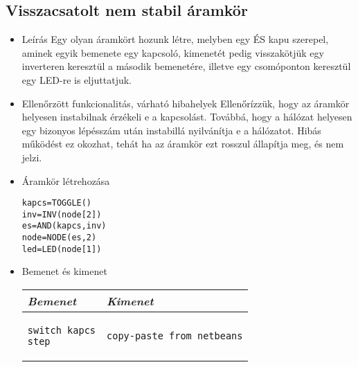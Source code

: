 \subsection{Visszacsatolt nem stabil áramkör}
\begin{itemize}
\item Leírás\newline
Egy olyan áramkört hozunk létre, melyben egy ÉS kapu szerepel, aminek egyik bemenete egy kapcsoló, kimenetét pedig visszakötjük egy inverteren keresztül a második bemenetére, illetve egy csomóponton keresztül egy LED-re is eljuttatjuk.
\item Ellenőrzött funkcionalitás, várható hibahelyek\newline
Ellenőrízzük, hogy az áramkör helyesen instabilnak érzékeli e a kapcsolást. Továbbá, hogy a hálózat helyesen egy bizonyos lépésszám után instabillá nyilvánítja e a hálózatot. Hibás működést ez okozhat, tehát ha az áramkör ezt rosszul állapítja meg, és nem jelzi.

\item Áramkör létrehozása

\begin{verbatim}
kapcs=TOGGLE()
inv=INV(node[2])
es=AND(kapcs,inv)
node=NODE(es,2)
led=LED(node[1])
\end{verbatim}

\item Bemenet és kimenet\newline

\begin{tabular}{|p{5cm}|p{5cm}|} 
\hline 
\textit{Bemenet} & \textit{Kimenet} \\ \hline
\begin{verbatim}
switch kapcs
step
\end{verbatim}
& 
\begin{verbatim}
copy-paste from netbeans
\end{verbatim}
\\ \hline
\end{tabular}

\end{itemize}


